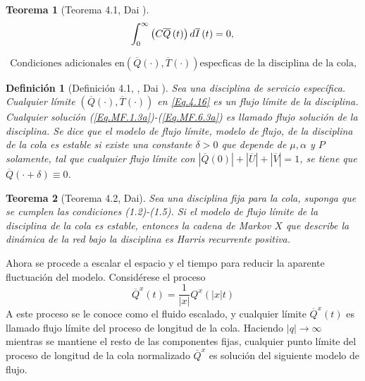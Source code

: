 \documentclass{article}
\newtheorem{Def}{Definición}
\newtheorem{Teo}{Teorema}
\begin{document}
\begin{Teo}[Teorema 4.1, Dai \cite{Dai}]
\begin{equation}\label{Eq.MF.5.3a}
\int_{0}^{\infty}\left(C\overline{Q}\left(t\right)\right)d\overline{I}\left(t\right)=0,\\
\end{equation}

\begin{equation}\label{Eq.MF.6.3a}
\textrm{Condiciones adicionales en
}\left(\overline{Q}\left(\cdot\right),\overline{T}\left(\cdot\right)\right)\textrm{
especficas de la disciplina de la cola,}
\end{equation}
\end{Teo}

\begin{Def}[Definici\'on 4.1, , Dai \cite{Dai}]
Sea una disciplina de servicio espec\'ifica. Cualquier l\'imite
$\left(\overline{Q}\left(\cdot\right),\overline{T}\left(\cdot\right)\right)$
en \ref{Eq.4.16} es un {\em flujo l\'imite} de la disciplina.
Cualquier soluci\'on (\ref{Eq.MF.1.3a})-(\ref{Eq.MF.6.3a}) es
llamado flujo soluci\'on de la disciplina. Se dice que el modelo de flujo l\'imite, modelo de flujo, de la disciplina de la cola es estable si existe una constante
$\delta>0$ que depende de $\mu,\alpha$ y $P$ solamente, tal que
cualquier flujo l\'imite con
$|\overline{Q}\left(0\right)|+|\overline{U}|+|\overline{V}|=1$, se
tiene que $\overline{Q}\left(\cdot+\delta\right)\equiv0$.
\end{Def}

\begin{Teo}[Teorema 4.2, Dai\cite{Dai}]\label{Tma.4.2.Dai}
Sea una disciplina fija para la cola, suponga que se cumplen las
condiciones (1.2)-(1.5). Si el modelo de flujo l\'imite de la
disciplina de la cola es estable, entonces la cadena de Markov $X$
que describe la din\'amica de la red bajo la disciplina es Harris
recurrente positiva.
\end{Teo}

Ahora se procede a escalar el espacio y el tiempo para reducir la
aparente fluctuaci\'on del modelo. Consid\'erese el proceso
\begin{equation}\label{Eq.3.7}
\overline{Q}^{x}\left(t\right)=\frac{1}{|x|}Q^{x}\left(|x|t\right)
\end{equation}
A este proceso se le conoce como el fluido escalado, y cualquier l\'imite $\overline{Q}^{x}\left(t\right)$ es llamado flujo l\'imite del proceso de longitud de la cola. Haciendo $|q|\rightarrow\infty$ mientras se mantiene el resto de las componentes fijas, cualquier punto l\'imite del proceso de longitud de la cola normalizado $\overline{Q}^{x}$ es soluci\'on del siguiente modelo de flujo.
\end{document}
